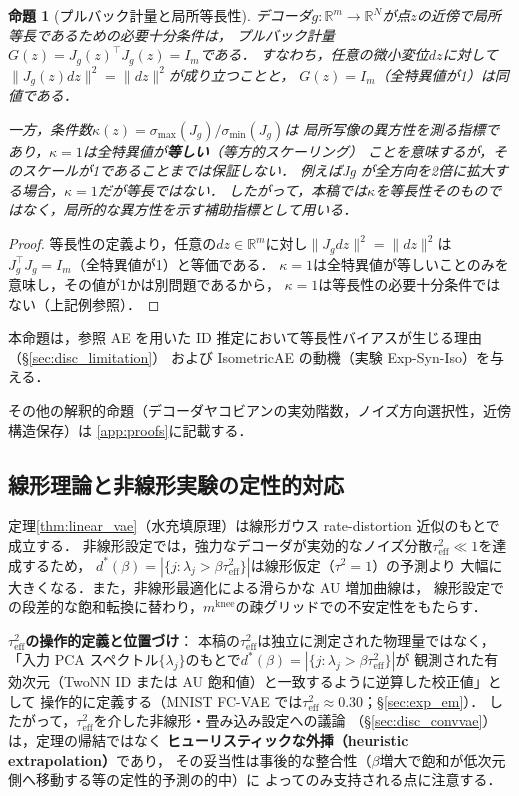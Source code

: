 \documentclass[11pt,a4paper]{jsarticle}
\newtheorem{proposition}{命題}
\newcommand{\Jg}{J_g}
\newcommand{\R}{\mathbb{R}}
\newcommand{\kap}{\kappa}
\newcommand{\mknee}{m^{\mathrm{knee}}}
\begin{document}
\begin{proposition}[プルバック計量と局所等長性]\label{thm:pullback}
デコーダ$g: \R^m \to \R^N$が点$z$の近傍で局所等長であるための必要十分条件は，
プルバック計量$G(z) = \Jg(z)^\top \Jg(z) = I_m$である．
すなわち，任意の微小変位$dz$に対して$\|\Jg(z)dz\|^2 = \|dz\|^2$が成り立つことと，
$G(z)=I_m$（全特異値が1）は同値である．

一方，条件数$\kap(z) = \sigma_{\max}(\Jg) / \sigma_{\min}(\Jg)$は
局所写像の異方性を測る指標であり，$\kap = 1$は全特異値が\textbf{等しい}（等方的スケーリング）
ことを意味するが，そのスケールが1であることまでは保証しない．
例えばJg が全方向を2倍に拡大する場合，$\kap=1$だが等長ではない．
したがって，本稿では$\kap$を等長性そのものではなく，局所的な異方性を示す補助指標として用いる．
\end{proposition}

\begin{proof}
等長性の定義より，任意の$dz \in \R^m$に対し$\|J_g dz\|^2 = \|dz\|^2$は
$J_g^\top J_g = I_m$（全特異値が1）と等価である．
$\kap = 1$は全特異値が等しいことのみを意味し，その値が1かは別問題であるから，
$\kap=1$は等長性の必要十分条件ではない（上記例参照）．
\end{proof}

本命題は，参照 AE を用いた ID 推定において等長性バイアスが生じる理由（§\ref{sec:disc_limitation}）
および IsometricAE の動機（実験 Exp-Syn-Iso）を与える．

その他の解釈的命題（デコーダヤコビアンの実効階数，ノイズ方向選択性，近傍構造保存）は
\ref{app:proofs}に記載する．

\subsection{線形理論と非線形実験の定性的対応}\label{sec:theory_bridge}

定理\ref{thm:linear_vae}（水充填原理）は線形ガウス rate-distortion 近似のもとで成立する．
非線形設定では，強力なデコーダが実効的なノイズ分散$\tau^2_\mathrm{eff} \ll 1$を達成するため，
$d^*(\beta) = |\{j : \lambda_j > \beta\tau^2_\mathrm{eff}\}|$は線形仮定（$\tau^2=1$）の予測より
大幅に大きくなる．また，非線形最適化による滑らかな AU 増加曲線は，
線形設定での段差的な飽和転換に替わり，$\mknee$の疎グリッドでの不安定性をもたらす．

\textbf{$\tau^2_\mathrm{eff}$の操作的定義と位置づけ}：
本稿の$\tau^2_\mathrm{eff}$は独立に測定された物理量ではなく，
「入力 PCA スペクトル$\{\lambda_j\}$のもとで$d^*(\beta) = |\{j : \lambda_j > \beta\tau^2_\mathrm{eff}\}|$が
観測された有効次元（TwoNN ID または AU 飽和値）と一致するように逆算した校正値」として
操作的に定義する（MNIST FC-VAE では$\tau^2_\mathrm{eff} \approx 0.30$；§\ref{sec:exp_em}）．
したがって，$\tau^2_\mathrm{eff}$を介した非線形・畳み込み設定への議論
（§\ref{sec:disc_convvae}）は，定理の帰結ではなく
\textbf{ヒューリスティックな外挿（heuristic extrapolation）}であり，
その妥当性は事後的な整合性（$\beta$増大で飽和が低次元側へ移動する等の定性的予測の的中）に
よってのみ支持される点に注意する．
\end{document}
